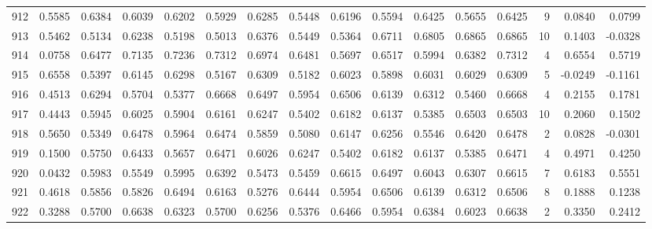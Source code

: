 \begin{tabular}{lrrrrrrrrrrrrrrr}
912 &      0.5585 &  0.6384 &  0.6039 &  0.6202 &  0.5929 &  0.6285 &  0.5448 &  0.6196 &  0.5594 &  0.6425 &   0.5655 &     0.6425 &      9 &                    0.0840 &                     0.0799 \\
913 &      0.5462 &  0.5134 &  0.6238 &  0.5198 &  0.5013 &  0.6376 &  0.5449 &  0.5364 &  0.6711 &  0.6805 &   0.6865 &     0.6865 &     10 &                    0.1403 &                    -0.0328 \\
914 &      0.0758 &  0.6477 &  0.7135 &  0.7236 &  0.7312 &  0.6974 &  0.6481 &  0.5697 &  0.6517 &  0.5994 &   0.6382 &     0.7312 &      4 &                    0.6554 &                     0.5719 \\
915 &      0.6558 &  0.5397 &  0.6145 &  0.6298 &  0.5167 &  0.6309 &  0.5182 &  0.6023 &  0.5898 &  0.6031 &   0.6029 &     0.6309 &      5 &                   -0.0249 &                    -0.1161 \\
916 &      0.4513 &  0.6294 &  0.5704 &  0.5377 &  0.6668 &  0.6497 &  0.5954 &  0.6506 &  0.6139 &  0.6312 &   0.5460 &     0.6668 &      4 &                    0.2155 &                     0.1781 \\
917 &      0.4443 &  0.5945 &  0.6025 &  0.5904 &  0.6161 &  0.6247 &  0.5402 &  0.6182 &  0.6137 &  0.5385 &   0.6503 &     0.6503 &     10 &                    0.2060 &                     0.1502 \\
918 &      0.5650 &  0.5349 &  0.6478 &  0.5964 &  0.6474 &  0.5859 &  0.5080 &  0.6147 &  0.6256 &  0.5546 &   0.6420 &     0.6478 &      2 &                    0.0828 &                    -0.0301 \\
919 &      0.1500 &  0.5750 &  0.6433 &  0.5657 &  0.6471 &  0.6026 &  0.6247 &  0.5402 &  0.6182 &  0.6137 &   0.5385 &     0.6471 &      4 &                    0.4971 &                     0.4250 \\
920 &      0.0432 &  0.5983 &  0.5549 &  0.5995 &  0.6392 &  0.5473 &  0.5459 &  0.6615 &  0.6497 &  0.6043 &   0.6307 &     0.6615 &      7 &                    0.6183 &                     0.5551 \\
921 &      0.4618 &  0.5856 &  0.5826 &  0.6494 &  0.6163 &  0.5276 &  0.6444 &  0.5954 &  0.6506 &  0.6139 &   0.6312 &     0.6506 &      8 &                    0.1888 &                     0.1238 \\
922 &      0.3288 &  0.5700 &  0.6638 &  0.6323 &  0.5700 &  0.6256 &  0.5376 &  0.6466 &  0.5954 &  0.6384 &   0.6023 &     0.6638 &      2 &                    0.3350 &                     0.2412 \\

\end{tabular}

